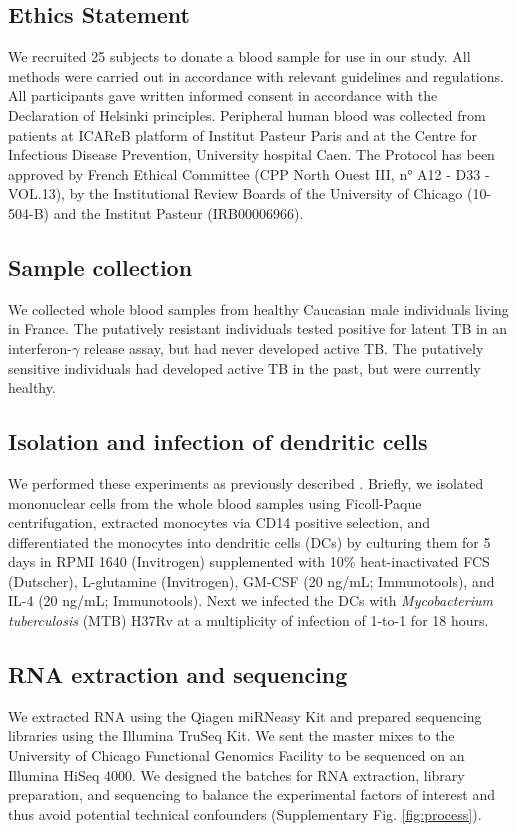 \documentclass[fleqn,10pt]{wlscirep}
\begin{document}
\subsection*{Ethics Statement}

We recruited 25 subjects to donate a blood sample for use in our
study. All methods were carried out in accordance with relevant
guidelines and regulations. All participants gave written informed
consent in accordance with the Declaration of Helsinki principles.
Peripheral human blood was collected from patients at ICAReB platform
of Institut Pasteur Paris and at the Centre for Infectious Disease
Prevention, University hospital Caen. The Protocol has been approved
by French Ethical Committee (CPP North Ouest III, n° A12 - D33
-VOL.13), by the Institutional Review Boards of the University of
Chicago (10-504-B) and the Institut Pasteur (IRB00006966).
\subsection*{Sample collection}

We collected whole blood samples from healthy Caucasian male
individuals living in France. The putatively resistant individuals
tested positive for latent TB in an interferon-$\gamma$ release assay,
but had never developed active TB. The putatively sensitive
individuals had developed active TB in the past, but were currently
healthy.
\subsection*{Isolation and infection of dendritic cells}

We performed these experiments as previously described
\cite{Barreiro2012}. Briefly, we isolated mononuclear cells from the
whole blood samples using Ficoll-Paque centrifugation, extracted
monocytes via CD14 positive selection, and differentiated the
monocytes into dendritic cells (DCs) by culturing them for 5 days in
RPMI 1640 (Invitrogen) supplemented with 10\% heat-inactivated FCS
(Dutscher), L-glutamine (Invitrogen), GM-CSF (20 ng/mL; Immunotools),
and IL-4 (20 ng/mL; Immunotools). Next we infected the DCs with
\emph{Mycobacterium tuberculosis} (MTB) H37Rv at a multiplicity of
infection of 1-to-1 for 18 hours.
\subsection*{RNA extraction and sequencing}

We extracted RNA using the Qiagen miRNeasy Kit and prepared sequencing
libraries using the Illumina TruSeq Kit. We sent the master mixes to
the University of Chicago Functional Genomics Facility to be sequenced
on an Illumina HiSeq 4000. We designed the batches for RNA extraction,
library preparation, and sequencing to balance the experimental
factors of interest and thus avoid potential technical confounders
(Supplementary Fig. \ref{fig:process}).
\end{document}
